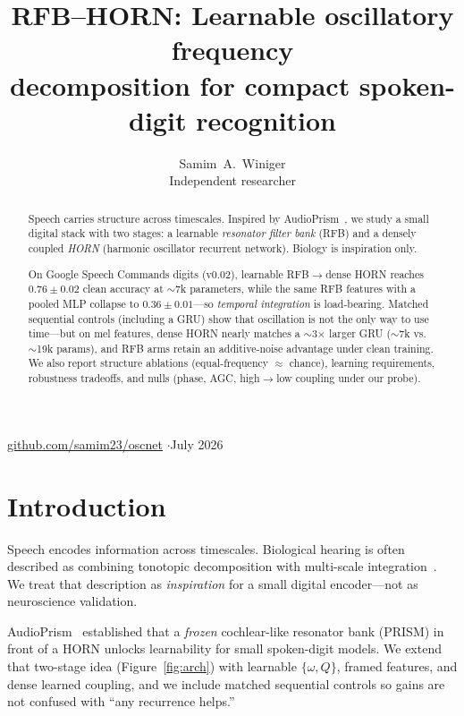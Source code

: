 \documentclass[11pt,a4paper]{article}
\title{\textbf{RFB--HORN: Learnable oscillatory frequency\\decomposition for compact spoken-digit recognition}}
\author{Samim~A.~Winiger\\
\small Independent researcher}
\date{}
\begin{document}
\maketitle
\begin{center}
\small
\href{https://github.com/samim23/oscnet}{github.com/samim23/oscnet}
\quad$\cdot$\quad July 2026
\end{center}

\begin{abstract}
Speech carries structure across timescales. Inspired by
AudioPrism~\citep{pietras2026audioprism}, we study a small digital stack with
two stages: a learnable \emph{resonator filter bank} (RFB) and a densely
coupled \emph{HORN} (harmonic oscillator recurrent network). Biology is
inspiration only.

On Google Speech Commands digits (v0.02), learnable RFB$\to$dense HORN reaches
$0.76\pm0.02$ clean accuracy at $\sim$7k parameters, while the same RFB
features with a pooled MLP collapse to $0.36\pm0.01$---so
\emph{temporal integration} is load-bearing. Matched sequential controls
(including a GRU) show that oscillation is not the only way to use time---but
on mel features, dense HORN nearly matches a $\sim$3$\times$ larger GRU
($\sim$7k vs.\ $\sim$19k params), and RFB arms retain an additive-noise
advantage under clean training. We also report structure
ablations (equal-frequency $\approx$ chance), learning requirements,
robustness tradeoffs, and nulls (phase, AGC, high$\to$low coupling under our
probe).
\end{abstract}

\section{Introduction}
\label{sec:intro}

Speech encodes information across timescales. Biological hearing is often
described as combining tonotopic decomposition with multi-scale
integration~\citep{pietras2026audioprism}. We treat that description as
\emph{inspiration} for a small digital encoder---not as neuroscience
validation.

AudioPrism~\citep{pietras2026audioprism} established that a \emph{frozen}
cochlear-like resonator bank (PRISM) in front of a HORN unlocks learnability
for small spoken-digit models. We extend that two-stage idea
(Figure~\ref{fig:arch}) with learnable $\{\omega,Q\}$, framed features, and dense
learned coupling, and we include matched sequential controls so gains are not
confused with ``any recurrence helps.''
\end{document}

